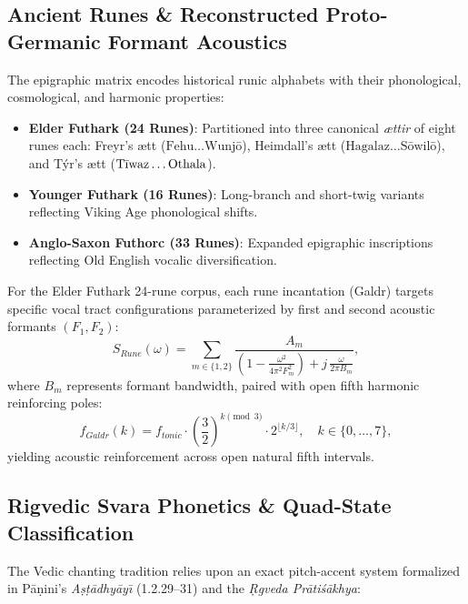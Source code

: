 \documentclass[11pt,a4paper,reqno]{article}
\def\mathrm#1{#1}%
\theoremstyle{plain}
\theoremstyle{definition}
\theoremstyle{remark}
\numberwithin{equation}{section}
\begin{document}
\subsection{\texorpdfstring{Ancient Runes \& Reconstructed Proto-Germanic Formant Acoustics}{Ancient Runes and Reconstructed Proto-Germanic Formant Acoustics}}
The epigraphic matrix encodes historical runic alphabets with their phonological, cosmological, and harmonic properties:
\begin{itemize}
    \item \textbf{Elder Futhark (24 Runes)}: Partitioned into three canonical \emph{\ae ttir} of eight runes each: Freyr's \ae tt ($\text{Fehu} \dots \text{Wunj\={o}}$), Heimdall's \ae tt ($\text{Hagalaz} \dots \text{S\={o}wil\={o}}$), and T\'yr's \ae tt ($\text{T\={\i}waz} \dots \text{Othala}$).
    \item \textbf{Younger Futhark (16 Runes)}: Long-branch and short-twig variants reflecting Viking Age phonological shifts.
    \item \textbf{Anglo-Saxon Futhorc (33 Runes)}: Expanded epigraphic inscriptions reflecting Old English vocalic diversification.
\end{itemize}

For the Elder Futhark 24-rune corpus, each rune incantation (Galdr) targets specific vocal tract configurations parameterized by first and second acoustic formants $(F_1, F_2)$:
\begin{equation}
\label{eq:runic_formant}
S_{\mathrm{Rune}}(\omega) = \sum_{m \in \{1, 2\}} \frac{A_m}{\left(1 - \frac{\omega^2}{4\pi^2 F_m^2}\right) + j \, \frac{\omega}{2\pi B_m}},
\end{equation}
where $B_m$ represents formant bandwidth, paired with open fifth harmonic reinforcing poles:
\begin{equation}
\label{eq:galdr_resonance}
f_{\mathrm{Galdr}}(k) = f_{\mathrm{tonic}} \cdot \left(\frac{3}{2}\right)^{k \pmod 3} \cdot 2^{\lfloor k/3 \rfloor}, \quad k \in \{0, \dots, 7\},
\end{equation}
yielding acoustic reinforcement across open natural fifth intervals.

\subsection{\texorpdfstring{Rigvedic Svara Phonetics \& Quad-State Classification}{Rigvedic Svara Phonetics and Quad-State Classification}}
The Vedic chanting tradition relies upon an exact pitch-accent system formalized in P\={a}\d{n}ini's \emph{A\d{s}\d{t}\={a}dhy\={a}y\={\i}} (1.2.29--31) and the \emph{\d{R}gveda Pr\={a}ti\'{s}\={a}khya}:
\end{document}
